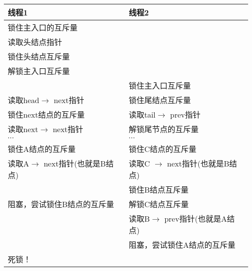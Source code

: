 \begin{table}[htbp]
    \begin{tabular}{|l|l|}
    \hline
    线程1                                     & 线程2                                          \\ \hline
    锁住主入口的互斥量                               &                                              \\ \hline
    读取头结点指针                                 &                                              \\ \hline
    锁住头结点互斥量                                &                                              \\ \hline
    解锁主入口互斥量                                &                                              \\ \hline
                                            & 锁住主入口互斥量                                     \\ \hline
    读取head\(\rightarrow\) next指针 & 锁住尾结点互斥量                                     \\ \hline
    锁住next结点的互斥量                                 & 读取tail\(\rightarrow\) prev指针       \\ \hline
    读取next\(\rightarrow\) next指针                           & 解锁尾节点的互斥量                                    \\ \hline
    \(\cdots\)                   & \(\cdots\)                        \\ \hline
    锁住A结点的互斥量                               & 锁住C结点的互斥量                                    \\ \hline
    读取A\(\rightarrow\) next指针(也就是B结点) & 读取C \(\rightarrow\) next指针(也就是B结点) \\ \hline
                                            & 锁住B结点互斥量                                     \\ \hline
    阻塞，尝试锁住B结点的互斥量                          & 解锁C结点互斥量                                     \\ \hline
                                            & 读取B\(\rightarrow\) prev指针(也就是A结点) \\ \hline
                                            & 阻塞，尝试锁住A结点的互斥量                               \\ \hline
    死锁！                                     &                                              \\ \hline
    \end{tabular}
    \end{table}

